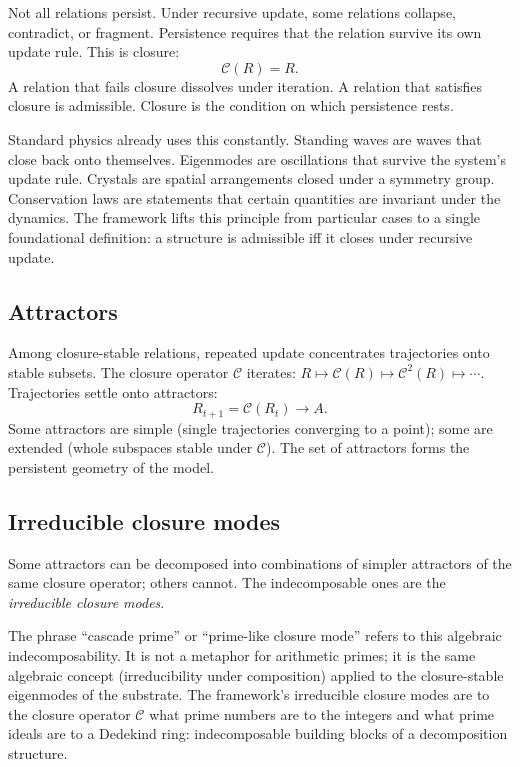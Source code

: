 \documentclass[11pt]{article}
\theoremstyle{plain}
\theoremstyle{definition}
\theoremstyle{remark}
\newcommand{\Ccal}{\mathcal{C}}
\begin{document}
Not all relations persist. Under recursive update, some relations collapse, contradict, or fragment. Persistence requires that the relation survive its own update rule. This is closure:
\[
  \Ccal(R) = R.
\]
A relation that fails closure dissolves under iteration. A relation that satisfies closure is admissible. Closure is the condition on which persistence rests.

Standard physics already uses this constantly. Standing waves are waves that close back onto themselves. Eigenmodes are oscillations that survive the system's update rule. Crystals are spatial arrangements closed under a symmetry group. Conservation laws are statements that certain quantities are invariant under the dynamics. The framework lifts this principle from particular cases to a single foundational definition: a structure is admissible iff it closes under recursive update.

\subsection{Attractors}

Among closure-stable relations, repeated update concentrates trajectories onto stable subsets. The closure operator $\Ccal$ iterates: $R \mapsto \Ccal(R) \mapsto \Ccal^2(R) \mapsto \cdots$. Trajectories settle onto attractors:
\[
  R_{t+1} = \Ccal(R_t) \to A.
\]
Some attractors are simple (single trajectories converging to a point); some are extended (whole subspaces stable under $\Ccal$). The set of attractors forms the persistent geometry of the model.

\subsection{Irreducible closure modes}

Some attractors can be decomposed into combinations of simpler attractors of the same closure operator; others cannot. The indecomposable ones are the \emph{irreducible closure modes}.

The phrase ``cascade prime'' or ``prime-like closure mode'' refers to this algebraic indecomposability. It is not a metaphor for arithmetic primes; it is the same algebraic concept (irreducibility under composition) applied to the closure-stable eigenmodes of the substrate. The framework's irreducible closure modes are to the closure operator $\Ccal$ what prime numbers are to the integers and what prime ideals are to a Dedekind ring: indecomposable building blocks of a decomposition structure.
\end{document}
